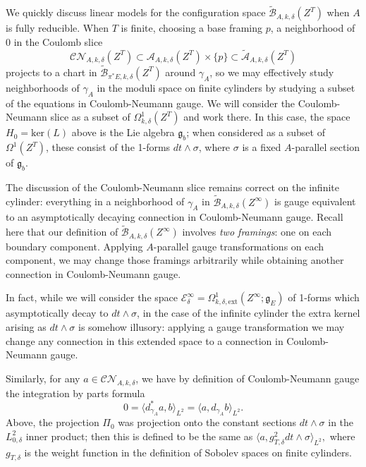 \documentclass[10pt,a4paper]{amsart}
\newcommand{\pE}{\pi^* \! E}
\theoremstyle{definition}
\theoremstyle{remark}
\numberwithin{figure}{qchap}
\begin{document}
We quickly discuss linear models for the configuration space $\widetilde{\mathcal B}_{A,k,\delta}(Z^T)$ when $A$ is fully reducible. When $T$ is finite, choosing a base framing $p$, a neighborhood of $0$ in the Coulomb slice $$\mathcal{CN}_{A,k,\delta}(Z^T) \subset \mathcal A_{A,k,\delta}(Z^T) \times \{p\} \subset \widetilde{\mathcal A}_{A,k,\delta}(Z^T)$$ projects to a chart in $\widetilde{\mathcal B}_{\pE,k,\delta}(Z^T)$ around $\gamma_A$, so we may effectively study neighborhoods of $\gamma_A$ in the moduli space on finite cylinders by studying a subset of the equations in Coulomb-Neumann gauge. We will consider the Coulomb-Neumann slice as a subset of $\Omega^1_{k,\delta}(Z^T)$ and work there. In this case, the space $H_0 = \text{ker}(L)$ above is the Lie algebra $\mathfrak g_b$; when considered as a subset of $\Omega^1(Z^T)$, these consist of the 1-forms $dt \wedge \sigma$, where $\sigma$ is a fixed $A$-parallel section of $\mathfrak g_b$.

The discussion of the Coulomb-Neumann slice remains correct on the infinite cylinder: everything in a neighborhood of $\gamma_A$ in $\widetilde{\mathcal B}_{A,k,\delta}(Z^\infty)$ is gauge equivalent to an asymptotically decaying connection in Coulomb-Neumann gauge. Recall here that our definition of $\widetilde{\mathcal B}_{A,k,\delta}(Z^\infty)$ involves \emph{two framings}: one on each boundary component. Applying $A$-parallel gauge transformations on each component, we may change those framings arbitrarily while obtaining another connection in Coulomb-Neumann gauge.

In fact, while we will consider the space $\mathcal E^\infty_\delta = \Omega^1_{k,\delta,\text{ext}}(Z^\infty;\mathfrak g_E)$ of 1-forms which asymptotically decay to $dt \wedge \sigma$, in the case of the infinite cylinder the extra kernel arising as $dt \wedge \sigma$ is somehow illusory: applying a gauge transformation we may change any connection in this extended space to a connection in Coulomb-Neumann gauge.

Similarly, for any $a \in \mathcal{CN}_{A,k,\delta}$, we have by definition of Coulomb-Neumann gauge the integration by parts formula 
$$0 = \langle d_{\gamma_A}^* a, b \rangle_{L^2} = \langle a, d_{\gamma_A} b\rangle_{L^2}.$$ 
Above, the projection $\Pi_0$ was projection onto the constant sections $dt \wedge \sigma$ in the $L^2_{0,\delta}$ inner product; then this is defined to be the same as $\langle a, g_{T, \delta}^2 dt \wedge \sigma\rangle_{L^2},$ where $g_{T,\delta}$ is the weight function in the definition of Sobolev spaces on finite cylinders.
\end{document}
